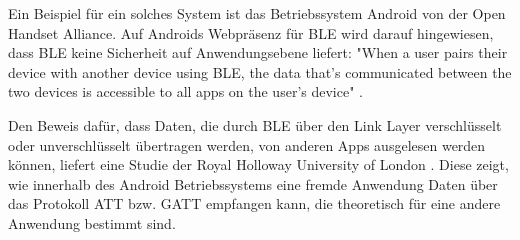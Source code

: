 Ein Beispiel für ein solches System ist das Betriebssystem Android von der Open Handset Alliance. Auf Androids Webpräsenz für BLE wird darauf hingewiesen, dass BLE keine Sicherheit auf Anwendungsebene liefert: "When a user pairs their device with another device using BLE, the data that's communicated between the two devices is accessible to all apps on the user's device" \cite{AndroidAppLayerSec}.

Den Beweis dafür, dass Daten, die durch BLE über den Link Layer verschlüsselt oder unverschlüsselt übertragen werden, von anderen Apps ausgelesen werden können, liefert eine Studie der Royal Holloway University of London \cite{RoyalHollowayUniversity}. Diese zeigt, wie innerhalb des Android Betriebssystems eine fremde Anwendung Daten über das Protokoll ATT bzw. GATT 
empfangen kann, die theoretisch für eine andere Anwendung bestimmt sind.


